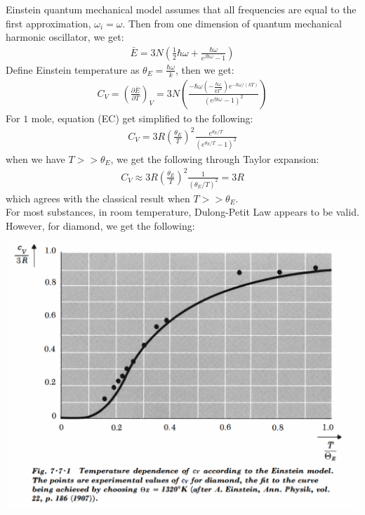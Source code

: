 \documentclass[11pt,oneside]{book}
\theoremstyle{break}
\theoremstyle{break}
\begin{document}
Einstein quantum mechanical model assumes that all frequencies are equal to the first approximation, $\omega_i = \omega$. Then from one dimension of quantum mechanical harmonic oscillator, we get:
\begin{align*}
\bar{E} = 3N \left( \frac{1}{2}\hbar \omega + \frac{\hbar\omega}{e^{\beta \hbar \omega}-1}\right)
\end{align*}
Define Einstein temperature as $\theta_E = \frac{\hbar \omega}{k}$, then we get:
\begin{align*}
C_V = \left(\frac{\partial \bar{E}}{\partial T} \right)_V = 3N \left( \frac{-\hbar \omega\left(-\frac{\hbar \omega}{kT^2}\right) e^{-\hbar \omega / (kT)}}{\left( e^{\beta \hbar \omega}-1\right)^2}\right) \tag{EC}
\end{align*}
For $1$ mole, equation (EC) get simplified to the following:
\begin{align*}
C_V = 3R\left( \frac{\theta_E}{T}\right)^2 \frac{e^{\theta_E/T}}{\left( e^{\theta_E/T}-1\right)^2}
\end{align*}
when we have $T>>\theta_E$, we get the following through Taylor expansion:
\begin{align*}
C_V \approx 3R \left( \frac{\theta_E}{T}\right)^2 \frac{1}{(\theta_E /T)^2}= 3R
\end{align*}
which agrees with the classical result when $T>> \theta_E$.\\
\newpage
For most substances, in room temperature, Dulong-Petit Law appears to be valid. However, for diamond, we get the following:\\
\begin{center}
\includegraphics[scale=0.6]{diamond.png}
\end{center}
\end{document}
